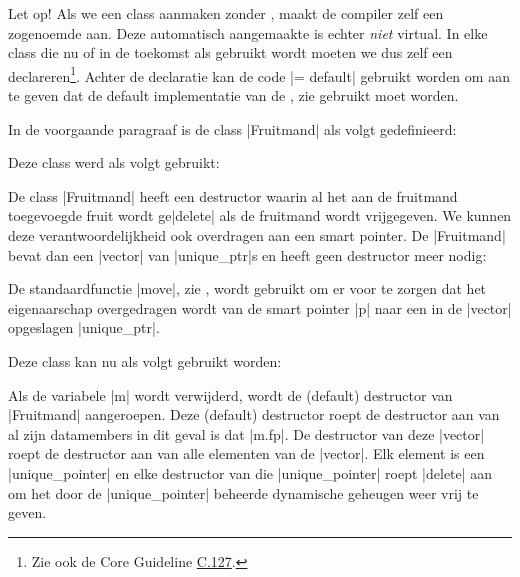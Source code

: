\begin{cpplstShortInline}
Let op! Als we een class aanmaken zonder , maakt de compiler zelf een zogenoemde \emph{} aan.
Deze automatisch aangemaakte  is echter \emph{niet} virtual.
In elke class die nu of in de toekomst als  gebruikt wordt moeten we dus zelf een  declareren\footnote{%
	Zie ook de \Cpp{} Core Guideline \href{https://isocpp.github.io/CppCoreGuidelines/CppCoreGuidelines\#c127-a-class-with-a-virtual-function-should-have-a-virtual-or-protected-destructor}{C.127}.
}. Achter de declaratie kan de code |= default| gebruikt worden om aan te geven dat de default implementatie van de , zie  gebruikt moet worden. 

\label{sec:toepassingunique_ptr}
In de voorgaande paragraaf is de class |Fruitmand| als volgt gedefinieerd:


Deze class werd als volgt gebruikt:

De class |Fruitmand| heeft een destructor waarin al het aan de fruitmand toegevoegde fruit wordt ge|delete| als de fruitmand wordt vrijgegeven.
We kunnen deze verantwoordelijkheid ook overdragen aan een smart pointer.%
De |Fruitmand| bevat dan een |vector| van |unique_ptr|s en heeft geen destructor meer nodig:

De standaardfunctie |move|, zie , wordt gebruikt om er voor te zorgen dat het eigenaarschap overgedragen wordt van de smart pointer |p| naar een in de |vector| opgeslagen |unique_ptr|. 

Deze class kan nu als volgt gebruikt worden:

Als de variabele |m| wordt verwijderd, wordt de (default) destructor van |Fruitmand| aangeroepen.
Deze (default) destructor roept de destructor aan van al zijn datamembers in dit geval is dat |m.fp|.
De destructor van deze |vector| roept de destructor aan van alle elementen van de |vector|.
Elk element is een |unique_pointer| en elke destructor van die |unique_pointer| roept |delete| aan om het door de |unique_pointer| beheerde dynamische geheugen weer vrij te geven. 


\end{cpplstShortInline}
